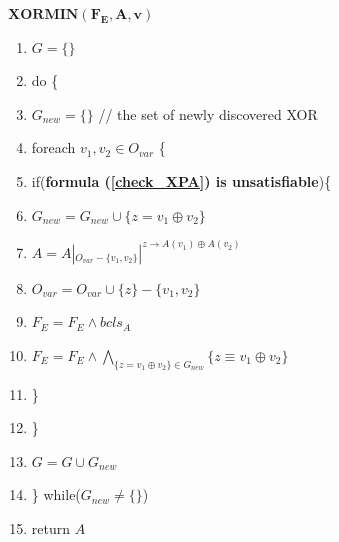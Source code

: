 \documentclass[journal]{IEEEtran}
\begin{document}
\begin{algo}\label{buildfdec}
\textbf{ $\boldsymbol{XORMIN(F_E, A,v)}$}
\begin{enumerate}%
\item $G=\{\}$
\item do \{

\item \hspace{0.3cm} $G_{new}=\{\}$  // the set of newly discovered XOR
\item \hspace{0.3cm} foreach $v_1,v_2\in O_{var}$ \{

\item \hspace{0.6cm}   if(\textbf{formula (\ref{check_XPA}) is unsatisfiable})\{

\item \hspace{0.9cm}     $G_{new}= G_{new}\cup \{ z= v_1\oplus v_2\}$
\item \hspace{0.9cm}     $A= A|_{O_{var}-\{v_1,v_2\}}|^{z\to A(v_1)\oplus A(v_2)}$
\item \hspace{0.9cm}     $O_{var}= O_{var}\cup \{z\}-\{v_1,v_2\}$
\item \hspace{0.9cm}     $F_E= F_E\wedge bcls_{A}$
\item \hspace{0.9cm}     $F_E= F_E\wedge \bigwedge _{\{z= v_1\oplus v_2\}\in G_{new}}\big\{z\equiv v_1\oplus v_2\big\}$

\item \hspace{0.6cm}   \}
\item \hspace{0.3cm} \}
\item \hspace{0.3cm} $G=G\cup G_{new}$
\item \} while($G_{new}\ne \{\}$)
\item return $A$
\end{enumerate}
\end{algo}

\vspace{0.2cm}
\end{document}
